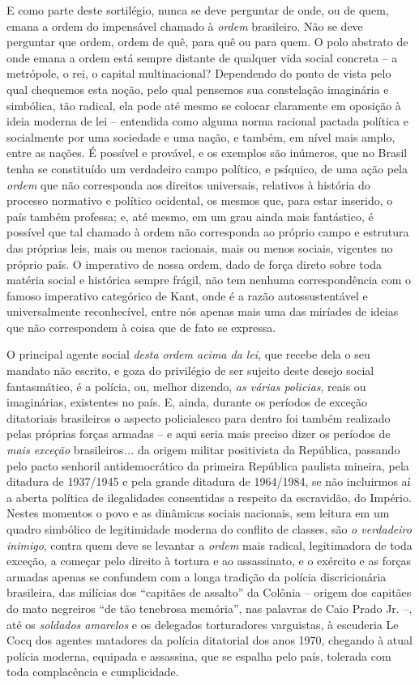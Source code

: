 E como parte deste sortilégio, nunca se deve perguntar de onde, ou de
quem, emana a ordem do impensável chamado à \emph{ordem} brasileiro. Não
se deve perguntar que ordem, ordem de quê, para quê ou para quem. O polo
abstrato de onde emana a ordem está sempre distante de qualquer vida
social concreta -- a metrópole, o rei, o capital multinacional?
Dependendo do ponto de vista pelo qual chequemos esta noção, pelo qual pensemos sua
constelação imaginária e simbólica, tão radical, ela pode até mesmo se
colocar claramente em oposição à ideia moderna de lei -- entendida como
alguma norma racional pactada política e socialmente por uma sociedade e
uma nação, e também, em nível mais amplo, entre as nações. É possível
e provável, e os exemplos são inúmeros, que no Brasil tenha se
constituído um verdadeiro campo político, e psíquico, de uma ação pela
\emph{ordem} que não corresponda aos direitos universais, relativos à
história do processo normativo e político ocidental, os mesmos que, para
estar inserido, o país também professa; e, até mesmo, em um grau ainda
mais fantástico, é possível que tal chamado à ordem não corresponda ao
próprio campo e estrutura das próprias leis, mais ou menos racionais,
mais ou menos sociais, vigentes no próprio país. O imperativo de nossa
ordem, dado de força direto sobre toda matéria social e histórica sempre
frágil, não tem nenhuma correspondência com o famoso imperativo
categórico de Kant, onde é a razão autossustentável e universalmente
reconhecível, entre nós apenas mais uma das miríades de ideias que não
correspondem à coisa que de fato se expressa.

O principal agente social \emph{desta ordem acima da lei}, que recebe
dela o seu mandato não escrito, e goza do privilégio de ser sujeito
deste desejo social fantasmático, é a polícia, ou, melhor dizendo,
\emph{as várias policias}, reais ou imaginárias, existentes no país. E,
ainda, durante os períodos de exceção ditatoriais brasileiros o aspecto
policialesco para dentro foi também realizado pelas próprias forças
armadas -- e aqui seria mais preciso dizer os períodos de \emph{mais
exceção} brasileiros\emph{...} da origem militar positivista da
República, passando pelo pacto senhoril antidemocrático da primeira
República paulista mineira, pela ditadura de 1937/1945 e pela grande
ditadura de 1964/1984, se não incluirmos aí a aberta política de
ilegalidades consentidas a respeito da escravidão, do Império.
Nestes momentos o povo e as dinâmicas sociais nacionais, sem leitura em
um quadro simbólico de legitimidade moderna do conflito de classes, são
\emph{o verdadeiro inimigo}, contra quem deve se levantar a \emph{ordem}
mais radical, legitimadora de toda exceção, a começar pelo direito à
tortura e ao assassinato, e o exército e as forças armadas apenas se
confundem com a longa tradição da polícia discricionária brasileira, das
milícias dos ``capitães de assalto'' da Colônia -- origem dos capitães
do mato negreiros ``de tão tenebrosa memória'', nas palavras de Caio
Prado Jr. --, até os \emph{soldados amarelos} e os delegados
torturadores varguistas, à escuderia Le Cocq dos agentes matadores da
polícia ditatorial dos anos 1970, chegando à atual polícia moderna,
equipada e assassina, que se espalha pelo país, tolerada com toda
complacência e cumplicidade.

